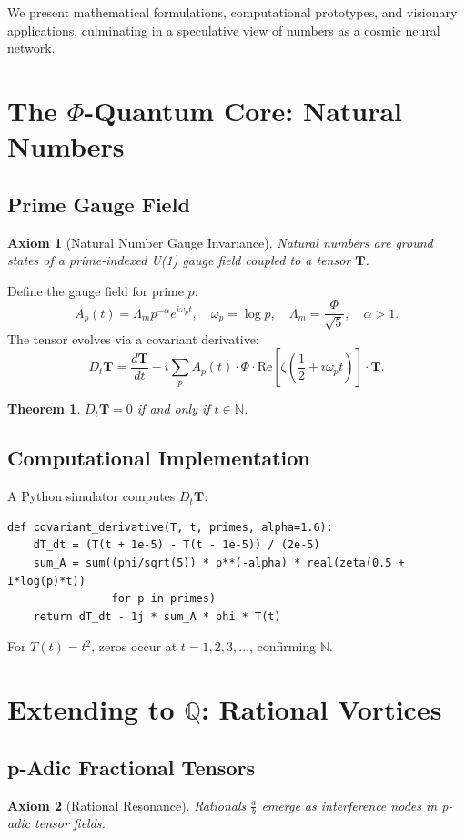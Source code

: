\documentclass{article}
\theoremstyle{plain}
\newtheorem{theorem}{Theorem}
\newtheorem{axiom}{Axiom}
\begin{document}
We present mathematical formulations, computational prototypes, and visionary applications, culminating in a speculative view of numbers as a cosmic neural network.

\section{The $\Phi$-Quantum Core: Natural Numbers}
\subsection{Prime Gauge Field}
\begin{axiom}[Natural Number Gauge Invariance]
Natural numbers are ground states of a prime-indexed U(1) gauge field coupled to a tensor $\mathbf{T}$.
\end{axiom}

Define the gauge field for prime $p$:
\[
A_p(t) = \Lambda_m p^{-\alpha} e^{i \omega_p t}, \quad \omega_p = \log p, \quad \Lambda_m = \frac{\Phi}{\sqrt{5}}, \quad \alpha > 1.
\]
The tensor evolves via a covariant derivative:
\[
D_t \mathbf{T} = \frac{d\mathbf{T}}{dt} - i \sum_p A_p(t) \cdot \Phi \cdot \text{Re}\left[\zeta\left(\frac{1}{2} + i \omega_p t\right)\right] \cdot \mathbf{T}.
\]
\begin{theorem}
$D_t \mathbf{T} = 0$ if and only if $t \in \mathbb{N}$.
\end{theorem}

\subsection{Computational Implementation}
A Python simulator computes $D_t \mathbf{T}$:
\begin{verbatim}
def covariant_derivative(T, t, primes, alpha=1.6):
    dT_dt = (T(t + 1e-5) - T(t - 1e-5)) / (2e-5)
    sum_A = sum((phi/sqrt(5)) * p**(-alpha) * real(zeta(0.5 + I*log(p)*t))
                for p in primes)
    return dT_dt - 1j * sum_A * phi * T(t)
\end{verbatim}
For $T(t) = t^2$, zeros occur at $t = 1, 2, 3, \dots$, confirming $\mathbb{N}$.

\section{Extending to $\mathbb{Q}$: Rational Vortices}
\subsection{p-Adic Fractional Tensors}
\begin{axiom}[Rational Resonance]
Rationals $\frac{a}{b}$ emerge as interference nodes in p-adic tensor fields.
\end{axiom}
\end{document}
